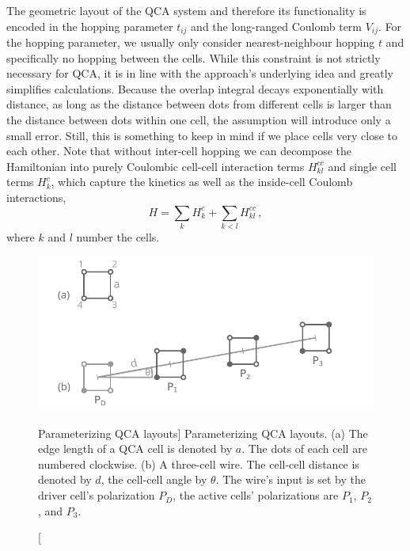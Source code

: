 The geometric layout of the QCA system and therefore its functionality is
encoded in the hopping parameter $t_{ij}$ and the long-ranged Coulomb term
$V_{ij}$. For the hopping parameter, we usually only consider nearest-neighbour
hopping $t$ and specifically no hopping between the cells. While this constraint
is not strictly necessary for QCA, it is in line with the approach's underlying
idea and greatly simplifies calculations. Because the overlap integral decays
exponentially with distance, as long as the distance between dots from different
cells is larger than the distance between dots within one cell, the assumption
will introduce only a small error. Still, this is something to keep in mind if
we place cells very close to each other. Note that without inter-cell hopping we
can decompose the Hamiltonian into purely Coulombic cell-cell interaction terms
$H^{cc}_{kl}$ and single cell terms $H^c_k$, which capture the kinetics as well
as the inside-cell Coulomb interactions,
\begin{equation}
  \label{eq:H_cell}
  H = \sum_k H^c_k + \sum_{k<l} H^{cc}_{kl} \, ,
\end{equation}
where $k$ and $l$ number the cells. 

\begin{figure}
  \center
  \includegraphics{short_wire}
  \caption
  [Parameterizing QCA layouts]
  {Parameterizing QCA layouts. (a) The edge length of a QCA cell is
  denoted by $a$. The dots of each cell are numbered clockwise. (b) A
  three-cell wire. The cell-cell distance is denoted by $d$, the cell-cell angle
  by $\theta$. The wire's input is set by the driver cell's polarization $P_D$,
  the active cells' polarizations are $P_1$, $P_2$, and $P_3$.}
  \label{fig:short_wire}
\end{figure}

